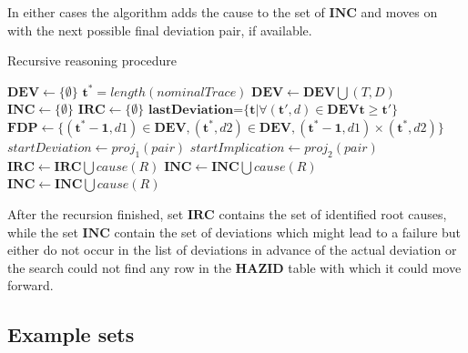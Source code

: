 \documentclass[conference]{IEEEtran}
\begin{document}
In either cases the algorithm adds the cause to the set of $\mathbf{INC}$ and moves on with the next possible final deviation pair, if available.

\begin{algorithm*}
\caption{Recursive reasoning procedure}
\label{alg:main}
\begin{algorithmic}[1]
\State $\mathbf{DEV} \leftarrow \{ \emptyset \}$
\State $\mathbf{t^*}=length(nominalTrace)$
\State $\mathbf{DEV} \leftarrow \mathbf{DEV} \bigcup (T,D)$
\EndFor
\EndFor
\State $\mathbf{INC} \leftarrow \{ \emptyset \}$
\State $\mathbf{IRC} \leftarrow \{ \emptyset \}$
\State $\mathbf{lastDeviation}$=$\{\mathbf{t}|\forall(\mathbf{t'},d) \in \mathbf{DEV} \mathbf{t} \ge \mathbf{t'} \}$
\State $\mathbf{FDP} \leftarrow \{(\mathbf{t^*-1},d1) \in \mathbf{DEV},(\mathbf{t^*},d2) \in \mathbf{DEV}, (\mathbf{t^*-1},d1) \times (\mathbf{t^*},d2) \}$ 
\EndFor
{}
  \State $startDeviation \leftarrow proj_1(pair)$
  \State $startImplication \leftarrow proj_2(pair)$
  \State {}
\EndFor
{}
     \State $\mathbf{IRC} \leftarrow \mathbf{IRC} \bigcup cause(R)$
     \State \Return
   \Else
          	\State {}
     \Else
      \State $\mathbf{INC} \leftarrow \mathbf{INC} \bigcup cause(R)$
      \State \Return
     \EndIf
   \EndIf
 \EndFor
\Else
\State $\mathbf{INC} \leftarrow \mathbf{INC} \bigcup cause(R)$
      \State \Return
\EndIf
\EndProcedure
\end{algorithmic}
\end{algorithm*}

After the recursion finished, set $\mathbf{IRC}$ contains the set of identified root causes, while the set
$\mathbf{INC}$ contain the set of deviations which might lead to a failure but either do not occur in the list
of deviations in advance of the actual deviation or the search could not find any row in the $\mathbf{HAZID}$ table with which it could move forward.

\subsection{Example sets}
\label{sec:exsets}
\end{document}
